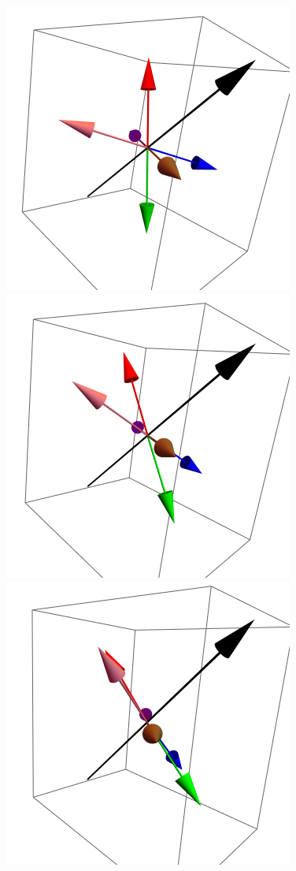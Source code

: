 \documentclass{article}
\begin{document}
\begin{figure}[ht]
\centering
\includegraphics[scale=0.29]{HVariedData/Pictures/101Inc1.png}
\includegraphics[scale=0.29]{HVariedData/Pictures/101Inc56.png}
\includegraphics[scale=0.29]{HVariedData/Pictures/101Inc61.png}

\end{figure}
\end{document}

